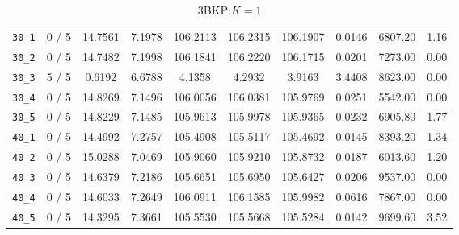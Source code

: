 \begin{table}[h!]
\begin{center}
\begin{tabular}{| c | c | c | c | c | c | c | c | c | c |}
\verb|30_1| & 0 / 5 & 14.7561 & 7.1978 & 106.2113 & 106.2315 & 106.1907 & 0.0146 & 6807.20 & 1.16\\ 
\verb|30_2| & 0 / 5 & 14.7482 & 7.1998 & 106.1841 & 106.2220 & 106.1715 & 0.0201 & 7273.00 & 0.00\\ 
\verb|30_3| & 5 / 5 & 0.6192 & 6.6788 & 4.1358 & 4.2932 & 3.9163 & 3.4408 & 8623.00 & 0.00\\ 
\verb|30_4| & 0 / 5 & 14.8269 & 7.1496 & 106.0056 & 106.0381 & 105.9769 & 0.0251 & 5542.00 & 0.00\\ 
\verb|30_5| & 0 / 5 & 14.8229 & 7.1485 & 105.9613 & 105.9978 & 105.9365 & 0.0232 & 6905.80 & 1.77\\ 
\verb|40_1| & 0 / 5 & 14.4992 & 7.2757 & 105.4908 & 105.5117 & 105.4692 & 0.0145 & 8393.20 & 1.34\\ 
\verb|40_2| & 0 / 5 & 15.0288 & 7.0469 & 105.9060 & 105.9210 & 105.8732 & 0.0187 & 6013.60 & 1.20\\ 
\verb|40_3| & 0 / 5 & 14.6379 & 7.2186 & 105.6651 & 105.6950 & 105.6427 & 0.0206 & 9537.00 & 0.00\\ 
\verb|40_4| & 0 / 5 & 14.6033 & 7.2649 & 106.0911 & 106.1585 & 105.9982 & 0.0616 & 7867.00 & 0.00\\ 
\verb|40_5| & 0 / 5 & 14.3295 & 7.3661 & 105.5530 & 105.5668 & 105.5284 & 0.0142 & 9699.60 & 3.52\\ 
\hline
\end{tabular}
\caption{3BKP:$K=1$}
\label{table:3BKP}
\end{center}
\end{table}


